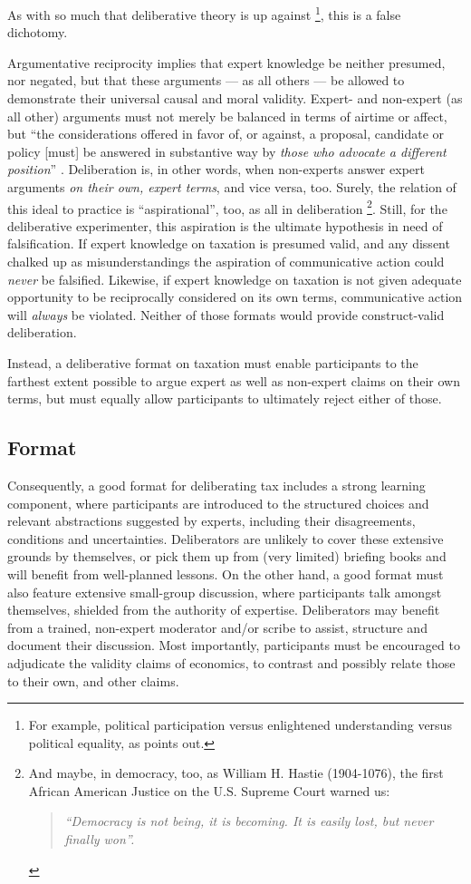 As with so much that deliberative theory is up against
\footnote{
	For example, political participation versus enlightened understanding versus political equality, as \citeauthor{Fishkin2009} points out.
}, %
this is a false dichotomy.

Argumentative reciprocity implies that expert knowledge be neither presumed, nor negated, but that these arguments --- as all others --- be allowed to demonstrate their universal causal and moral validity.
Expert- and non-expert (as all other) arguments must not merely be balanced in terms of airtime or affect, but ``the considerations offered in favor of, or against, a proposal, candidate or policy [must] be answered in substantive way by \emph{those who advocate a different position}'' \citep[K550, emphasis added]{Fishkin2009}.
Deliberation is, in other words, when non-experts answer expert arguments \emph{on their own, expert terms}, and vice versa, too.
Surely, the relation of this ideal to practice is ``aspirational'', too, as all in deliberation \citep[K2679]{Fishkin2009} 
\footnote{
 And maybe, in democracy, too, as William H. Hastie (1904-1076), the first African American Justice on the U.S. Supreme Court warned us:
 \begin{quote}
 	\emph{``Democracy is not being, it is becoming. It is easily lost, but never finally won''.}
 \end{quote}
}.
Still, for the deliberative experimenter, this aspiration is the ultimate hypothesis in need of falsification.
If expert knowledge on taxation is presumed valid, and any dissent chalked up as misunderstandings the aspiration of communicative action could \emph{never} be falsified.
Likewise, if expert knowledge on taxation is not given adequate opportunity to be reciprocally considered on its own terms, communicative action will \emph{always} be violated.
Neither of those formats would provide construct-valid deliberation.

Instead, a deliberative format on taxation must enable participants to the farthest extent possible to argue expert as well as non-expert claims on their own terms, but must equally allow participants to ultimately reject either of those.

\subsection{Format}
Consequently, a good format for deliberating tax includes a strong learning component, where participants are introduced to the structured choices and relevant abstractions suggested by experts, including their disagreements, conditions and uncertainties.
Deliberators are unlikely to cover these extensive grounds by themselves, or pick them up from (very limited) briefing books and will benefit from well-planned lessons.
On the other hand, a good format must also feature extensive small-group discussion, where participants talk amongst themselves, shielded from the authority of expertise.
Deliberators may benefit from a trained, non-expert moderator and/or scribe to assist, structure and document their discussion.
Most importantly, participants must be encouraged to adjudicate the validity claims of economics, to contrast and possibly relate those to their own, and other claims.

